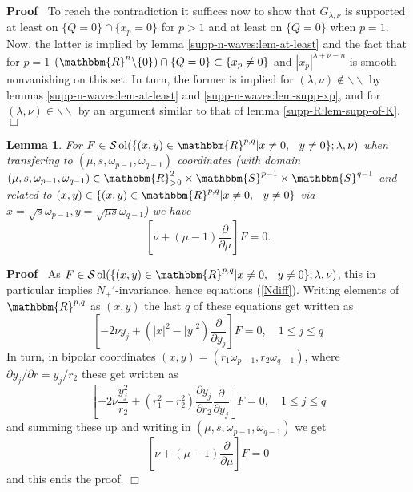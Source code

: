 \documentclass{article}
\newcommand{\nin}{\not\in}
\newcommand{\tmop}[1]{\ensuremath{\operatorname{#1}}}
\renewenvironment{proof}{\noindent\textbf{Proof\ }}{\hspace*{\fill}$\Box$\medskip}
\newtheorem{lemma}[proposition]{Lemma}
\theoremstyle{remark}
\newcommand{\R}{\mathbbm{R}}
\newcommand{\mysbra}[1]{\left[ #1 \right]}
\begin{document}
\begin{proof}
  To reach the contradiction it suffices now to show that $G_{\lambda, \nu}$
  is supported at least on $\{ Q = 0 \} \cap \{ x_p = 0 \}$ for $p > 1$ and at
  least on $\{ Q = 0 \}$ when $p = 1$. Now, the latter is implied by lemma
  \ref{supp-n-waves:lem-at-least} and the fact that for $p = 1$
  $(\mathbbm{R}^n \backslash \{ 0 \}) \cap \{ Q = 0 \} \subset \{ x_p \neq 0
  \}$ and $| x_p |^{\lambda + \nu - n}$ is smooth nonvanishing on this set. In
  turn, the former is implied for $(\lambda, \nu) \nin \backslash\backslash$
  by lemmas \ref{supp-n-waves:lem-at-least} and
  \ref{supp-n-waves:lem-supp-xp}, and for $(\lambda, \nu) \in
  \backslash\backslash$ by an argument similar to that of lemma
  \ref{supp-R:lem-supp-of-K}.
\end{proof}

\begin{lemma}
  \label{supp-Q:lem-operator}For $F \in \mathcal{S} \tmop{ol} (\{ (x, y) \in
  \R^{p, q} |x \neq 0, \hspace{0.75em} y \neq 0\}; \lambda, \nu)$ when
  transfering to $(\mu, s, \omega_{p - 1}, \omega_{q - 1})$ coordinates (with
  domain $(\mu, s, \omega_{p - 1}, \omega_{q - 1}) \in \mathbbm{R}_{> 0}^2
  \times \mathbbm{S}^{p - 1} \times \mathbbm{S}^{q - 1}$ and related to $(x,
  y) \in \{ (x, y) \in \R^{p, q} |x \neq 0, \hspace{0.75em} y \neq 0\}$ via $x
  = \sqrt{s} \omega_{p - 1}, y = \sqrt{\mu s} \omega_{q - 1}$) we have
  \[ \mysbra{\nu + (\mu - 1)  \frac{\partial}{\partial \mu}} F = 0. \]
\end{lemma}

\begin{proof}
  As $F \in \mathcal{S} \tmop{ol} (\{ (x, y) \in \R^{p, q} |x \neq 0,
  \hspace{0.75em} y \neq 0\}; \lambda, \nu)$, this in particular implies
  $N_+'$-invariance, hence equations (\ref{Ndiff}). Writing elements of
  $\R^{p, q}$ as $(x, y)$ the last $q$ of these equations get written as
  \[ \left[ - 2 \nu y_j + (| x |^2 - | y |^2) \frac{\partial}{\partial y_j}
     \right] F = 0, \quad 1 \leq j \leq q \]
  In turn, in bipolar coordinates $(x, y) = (r_1 \omega_{p - 1}, r_2 \omega_{q
  - 1})$, where $\partial y_j / \partial r = y_j / r_2$ these get written as
  \[ \mysbra{- 2 \nu \frac{y_j^2}{r_2} + (r_1^2 - r_2^2)  \frac{\partial
     y_j}{\partial r_2}  \frac{\partial}{\partial y_j}} F = 0, \quad 1 \leq j
     \leq q \]
  and summing these up and writing in $(\mu, s, \omega_{p - 1}, \omega_{q -
  1})$ we get
  \[ \mysbra{\nu + (\mu - 1)  \frac{\partial}{\partial \mu}} F = 0 \]
  and this ends the proof.
\end{proof}
\end{document}
